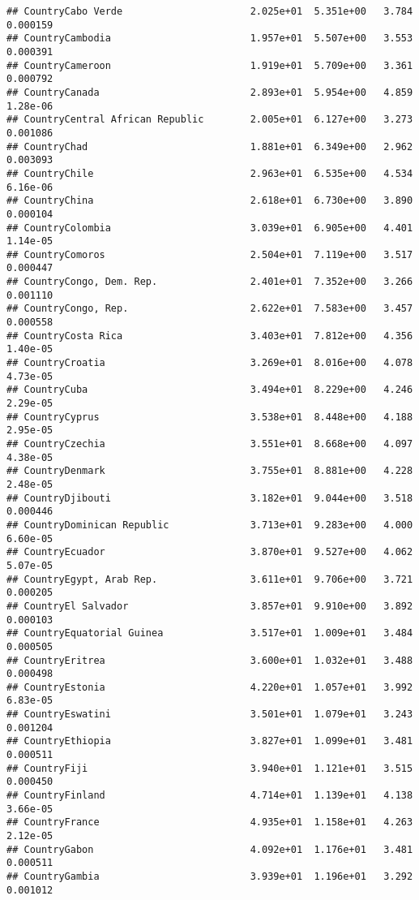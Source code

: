 \documentclass[
]{article}
\begin{document}
\begin{verbatim}
## CountryCabo Verde                      2.025e+01  5.351e+00   3.784 0.000159
## CountryCambodia                        1.957e+01  5.507e+00   3.553 0.000391
## CountryCameroon                        1.919e+01  5.709e+00   3.361 0.000792
## CountryCanada                          2.893e+01  5.954e+00   4.859 1.28e-06
## CountryCentral African Republic        2.005e+01  6.127e+00   3.273 0.001086
## CountryChad                            1.881e+01  6.349e+00   2.962 0.003093
## CountryChile                           2.963e+01  6.535e+00   4.534 6.16e-06
## CountryChina                           2.618e+01  6.730e+00   3.890 0.000104
## CountryColombia                        3.039e+01  6.905e+00   4.401 1.14e-05
## CountryComoros                         2.504e+01  7.119e+00   3.517 0.000447
## CountryCongo, Dem. Rep.                2.401e+01  7.352e+00   3.266 0.001110
## CountryCongo, Rep.                     2.622e+01  7.583e+00   3.457 0.000558
## CountryCosta Rica                      3.403e+01  7.812e+00   4.356 1.40e-05
## CountryCroatia                         3.269e+01  8.016e+00   4.078 4.73e-05
## CountryCuba                            3.494e+01  8.229e+00   4.246 2.29e-05
## CountryCyprus                          3.538e+01  8.448e+00   4.188 2.95e-05
## CountryCzechia                         3.551e+01  8.668e+00   4.097 4.38e-05
## CountryDenmark                         3.755e+01  8.881e+00   4.228 2.48e-05
## CountryDjibouti                        3.182e+01  9.044e+00   3.518 0.000446
## CountryDominican Republic              3.713e+01  9.283e+00   4.000 6.60e-05
## CountryEcuador                         3.870e+01  9.527e+00   4.062 5.07e-05
## CountryEgypt, Arab Rep.                3.611e+01  9.706e+00   3.721 0.000205
## CountryEl Salvador                     3.857e+01  9.910e+00   3.892 0.000103
## CountryEquatorial Guinea               3.517e+01  1.009e+01   3.484 0.000505
## CountryEritrea                         3.600e+01  1.032e+01   3.488 0.000498
## CountryEstonia                         4.220e+01  1.057e+01   3.992 6.83e-05
## CountryEswatini                        3.501e+01  1.079e+01   3.243 0.001204
## CountryEthiopia                        3.827e+01  1.099e+01   3.481 0.000511
## CountryFiji                            3.940e+01  1.121e+01   3.515 0.000450
## CountryFinland                         4.714e+01  1.139e+01   4.138 3.66e-05
## CountryFrance                          4.935e+01  1.158e+01   4.263 2.12e-05
## CountryGabon                           4.092e+01  1.176e+01   3.481 0.000511
## CountryGambia                          3.939e+01  1.196e+01   3.292 0.001012

\end{verbatim}
\end{document}

